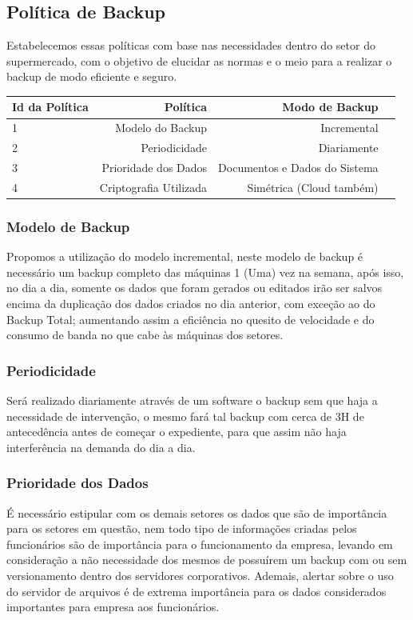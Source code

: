 \documentclass[12pt]{article}
\begin{document}
\subsection{Política de Backup}
Estabelecemos essas políticas com base nas necessidades dentro do setor do supermercado, com o objetivo de elucidar as normas e o meio para a realizar o backup de modo eficiente e seguro.

\begin{center}
\begin{tabular}{| l | r | r | r |}
\hline 
Id da Política & Política & Modo de Backup\\
\hline
1 & Modelo do Backup & Incremental\\
2 & Periodicidade & Diariamente\\
3 & Prioridade dos Dados & Documentos e Dados do Sistema\\
4 & Criptografia Utilizada & Simétrica (Cloud também)\\
\hline
\end{tabular}
\end{center}

\subsubsection{Modelo de Backup}
Propomos a utilização do modelo incremental, neste modelo de backup é necessário um backup completo das máquinas 1 (Uma) vez na semana, após isso, no dia a dia, somente os dados que foram gerados ou editados irão ser salvos encima da duplicação dos dados criados no dia anterior, com exceção ao do Backup Total; aumentando assim a eficiência no quesito de velocidade e do consumo de banda no que cabe às máquinas dos setores.

\subsubsection{Periodicidade}
Será realizado diariamente através de um software o backup sem que haja a necessidade de intervenção, o mesmo fará tal backup com cerca de 3H de antecedência antes de começar o expediente, para que assim não haja interferência na demanda do dia a dia. 

\subsubsection{Prioridade dos Dados}
É necessário estipular com os demais setores os dados que são de importância para os setores em questão, nem todo tipo de informações criadas pelos funcionários são de importância para o funcionamento da empresa, levando em consideração a não necessidade dos mesmos de possuírem um backup com ou sem versionamento dentro dos servidores corporativos. Ademais, alertar sobre o uso do servidor de arquivos é de extrema importância para os dados considerados importantes para empresa aos funcionários.
\end{document}
